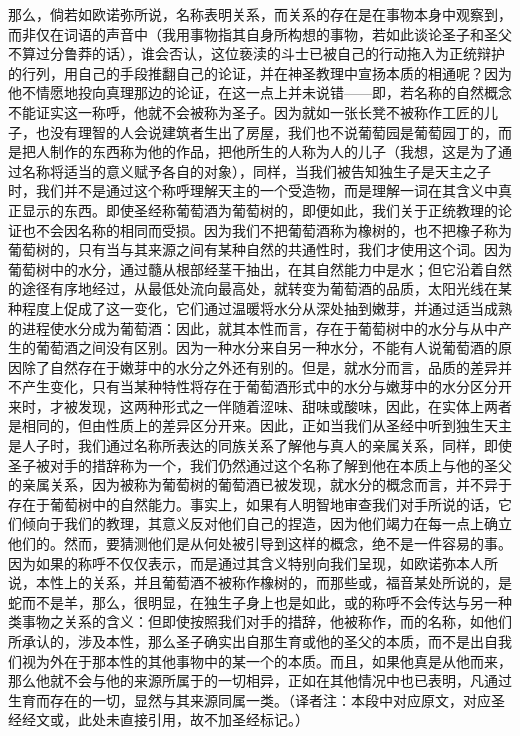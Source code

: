 那么，倘若如欧诺弥所说，名称表明关系，而关系的存在是在事物本身中观察到，而非仅在词语的声音中（我用事物指其自身所构想的事物，若如此谈论圣子和圣父不算过分鲁莽的话），谁会否认，这位亵渎的斗士已被自己的行动拖入为正统辩护的行列，用自己的手段推翻自己的论证，并在神圣教理中宣扬本质的相通呢？因为他不情愿地投向真理那边的论证，在这一点上并未说错——即，若名称的自然概念不能证实这一称呼，他就不会被称为圣子。因为就如一张长凳不被称作工匠的儿子，也没有理智的人会说建筑者生出了房屋，我们也不说葡萄园是葡萄园丁的，而是把人制作的东西称为他的作品，把他所生的人称为人的儿子（我想，这是为了通过名称将适当的意义赋予各自的对象），同样，当我们被告知独生子是天主之子时，我们并不是通过这个称呼理解天主的一个受造物，而是理解一词在其含义中真正显示的东西。即使圣经称葡萄酒为葡萄树的，即便如此，我们关于正统教理的论证也不会因名称的相同而受损。因为我们不把葡萄酒称为橡树的，也不把橡子称为葡萄树的，只有当与其来源之间有某种自然的共通性时，我们才使用这个词。因为葡萄树中的水分，通过髓从根部经茎干抽出，在其自然能力中是水；但它沿着自然的途径有序地经过，从最低处流向最高处，就转变为葡萄酒的品质，太阳光线在某种程度上促成了这一变化，它们通过温暖将水分从深处抽到嫩芽，并通过适当成熟的进程使水分成为葡萄酒：因此，就其本性而言，存在于葡萄树中的水分与从中产生的葡萄酒之间没有区别。因为一种水分来自另一种水分，不能有人说葡萄酒的原因除了自然存在于嫩芽中的水分之外还有别的。但是，就水分而言，品质的差异并不产生变化，只有当某种特性将存在于葡萄酒形式中的水分与嫩芽中的水分区分开来时，才被发现，这两种形式之一伴随着涩味、甜味或酸味，因此，在实体上两者是相同的，但由性质上的差异区分开来。因此，正如当我们从圣经中听到独生天主是人子时，我们通过名称所表达的同族关系了解他与真人的亲属关系，同样，即使圣子被对手的措辞称为一个，我们仍然通过这个名称了解到他在本质上与他的圣父的亲属关系，因为被称为葡萄树的葡萄酒已被发现，就水分的概念而言，并不异于存在于葡萄树中的自然能力。事实上，如果有人明智地审查我们对手所说的话，它们倾向于我们的教理，其意义反对他们自己的捏造，因为他们竭力在每一点上确立他们的。然而，要猜测他们是从何处被引导到这样的概念，绝不是一件容易的事。因为如果的称呼不仅仅表示，而是通过其含义特别向我们呈现，如欧诺弥本人所说，本性上的关系，并且葡萄酒不被称作橡树的，而那些或，福音某处所说的，是蛇而不是羊，那么，很明显，在独生子身上也是如此，或的称呼不会传达与另一种类事物之关系的含义：但即使按照我们对手的措辞，他被称作，而的名称，如他们所承认的，涉及本性，那么圣子确实出自那生育或他的圣父的本质，而不是出自我们视为外在于那本性的其他事物中的某一个的本质。而且，如果他真是从他而来，那么他就不会与他的来源所属于的一切相异，正如在其他情况中也已表明，凡通过生育而存在的一切，显然与其来源同属一类。\newline{}\newline{}（译者注：本段中对应原文，对应圣经经文或，此处未直接引用，故不加圣经标记。）\par

